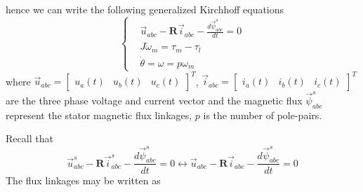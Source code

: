 \documentclass[11pt,a4paper,oneside]{book}
\numberwithin{equation}{section}
\theoremstyle{it}
\theoremstyle{definition}
\begin{document}
hence we can write the following generalized Kirchhoff equations
\begin{equation}\label{threephase_eq1}
	\left\lbrace \begin{aligned}
		& \vec{u}_{abc}-\mathbf{R}\vec{i}_{abc}-\frac{d\vec{\psi}^s_{abc}}{dt} 
		= 0 \\[6pt]
		& J\dot{\omega}_m = \tau_m-\tau_l \\[6pt]
		& \dot{\theta} = \omega = p\omega_m
	\end{aligned} \right. 
\end{equation}
where $\vec{u}_{abc}=\begin{bmatrix} u_a(t) &  u_b(t) & u_c(t) 
\end{bmatrix}^T$, $\vec{i}_{abc}=\begin{bmatrix} i_a(t) &  i_b(t) & i_c(t) 
\end{bmatrix}^T$ are the three phase voltage and current vector and the 
magnetic flux $\vec{\psi}^s_{abc}$ represent the stator magnetic flux linkages, 
$p$ is the number of pole-pairs.

Recall that 
\begin{equation*}
	\vec{u}_{abc}^s-\mathbf{R}\vec{i}_{abc}^s-\frac{d\vec{\psi}^s_{abc}}{dt} = 
	0 \leftrightarrow
	\vec{u}_{abc}-\mathbf{R}\vec{i}_{abc}-\frac{d\vec{\psi}^s_{abc}}{dt} = 0
\end{equation*}
The flux linkages may be written as
\end{document}
